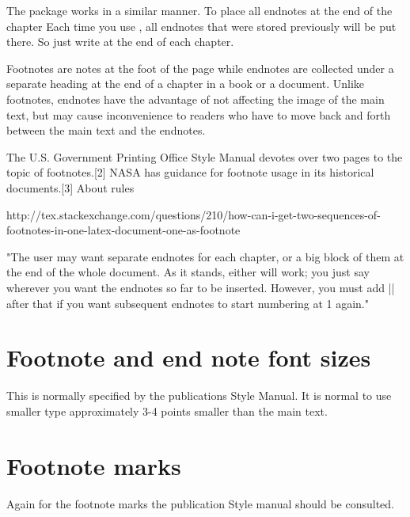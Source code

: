 The  package works in a similar manner. To place all endnotes at the end of the chapter Each time you use , all endnotes that were stored previously will be put there. So just write  at the end of each chapter.



Footnotes are notes at the foot of the page while endnotes are collected under a separate heading at the end of a chapter in a book or a document. Unlike footnotes, endnotes have the advantage of not affecting the image of the main text, but may cause inconvenience to readers who have to move back and forth between the main text and the endnotes.

The U.S. Government Printing Office Style Manual devotes over two pages to the topic of footnotes.[2] NASA has guidance for footnote usage in its historical documents.[3] About rules \pagenote{\notei}


http://tex.stackexchange.com/questions/210/how-can-i-get-two-sequences-of-footnotes-in-one-latex-document-one-as-footnote

 "The user may want separate endnotes for each chapter, or a big block of them at the end of the whole document. As it stands, either will work; you just say  wherever you want the endnotes so far to be inserted. However, you must add |\setcounter{endnote}{0}| after that if you want subsequent endnotes to start numbering at 1 again." 

\section*{Footnote and end note font sizes}

This is normally specified by the publications Style Manual. It is normal to use smaller type approximately 3-4 points smaller than the main text\pagenote{\noteii}\pagenote{\noteiv}.


\section*{Footnote marks}

Again for the footnote marks the publication Style manual should be consulted\pagenote{\noteiii}.

